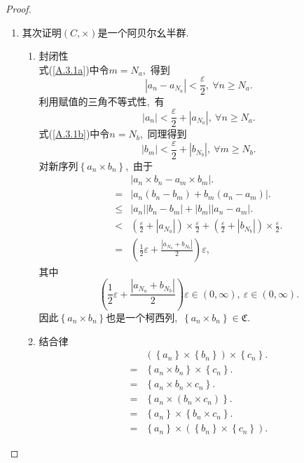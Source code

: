 \documentclass[UTF8, twoside]{ctexart}
\theoremstyle{nonumberplain}
\newtheorem{proof}{\heiti 证明}  %
\theoremstyle{nonumberplain}
\theoremstyle{plain}
\begin{document}
\begin{proof}
\begin{enumerate}
			\item 其次证明$\left( C,\times  \right)$是一个阿贝尔幺半群.\ 
			\vskip 0.3cm
			\begin{enumerate}
				\item 封闭性 \\
				式(\ref{A.3.1a})中令$m={{N}_{a}}$,\ 得到
				\[
					\left| {{a}_{n}}-{{a}_{{{N}_{a}}}} \right|<\frac{\varepsilon }{2},\ \forall n\ge {{N}_{a}}.
				\]
				利用赋值的三角不等式性,\ 有
				\[
					\left| {{a}_{n}} \right|<\frac{\varepsilon }{2}+\left| {{a}_{{{N}_{a}}}} \right|,\ \forall n\ge {{N}_{a}}.
				\]
				式(\ref{A.3.1b})中令$n={{N}_{b}}$,\ 同理得到
				\[
					\left| {{b}_{m}} \right|<\frac{\varepsilon }{2}+\left| {{b}_{{{N}_{b}}}} \right|,\ \forall m\ge {{N}_{b}}.
				\]
				对新序列$\left\{ {{a}_{n}}\times {{b}_{n}} \right\}$,\ 由于
				\begin{align*}
					& \left| {{a}_{n}}\times {{b}_{n}}-{{a}_{m}}\times {{b}_{m}} \right|. \\ 
					=&\left| {{a}_{n}}\left( {{b}_{n}}-{{b}_{m}} \right)+{{b}_{m}}\left( {{a}_{n}}-{{a}_{m}} \right) \right|. \\ 
					\le& \left| {{a}_{n}} \right|\left| {{b}_{n}}-{{b}_{m}} \right|+\left| {{b}_{m}} \right|\left| {{a}_{n}}-{{a}_{m}} \right|. \\ 
					<&\left( \frac{\varepsilon }{2}+\left| {{a}_{{{N}_{a}}}} \right| \right)\times \frac{\varepsilon }{2}+\left( \frac{\varepsilon }{2}+\left| {{b}_{{{N}_{b}}}} \right| \right)\times \frac{\varepsilon }{2}. \\ 
					=&\left( \frac{1}{2}\varepsilon +\frac{\left| {{a}_{{{N}_{a}}}}+{{b}_{{{N}_{b}}}} \right|}{2} \right)\varepsilon ,  
				\end{align*}
				其中
				\[
					\left( \frac{1}{2}\varepsilon +\frac{\left| {{a}_{{{N}_{a}}}}+{{b}_{{{N}_{b}}}} \right|}{2} \right)\varepsilon \in \left( 0,\infty  \right),
					\ \varepsilon \in \left( 0,\infty  \right).
				\]
				因此$\left\{ {{a}_{n}}\times {{b}_{n}} \right\}$也是一个柯西列,\ 
				$\left\{ {{a}_{n}}\times {{b}_{n}} \right\}\in \mathfrak{C}$.\ 
				\vskip 0.3cm
				
				\item 结合律 
				\begin{align*}
					&\left( \left\{ {{a}_{n}} \right\}\times \left\{ {{b}_{n}} \right\} \right)\times \left\{ {{c}_{n}} \right\}. \\ 
					=&\left\{ {{a}_{n}}\times {{b}_{n}} \right\}\times \left\{ {{c}_{n}} \right\}. \\ 
					=&\left\{ {{a}_{n}}\times {{b}_{n}}\times {{c}_{n}} \right\}. \\ 
					=&\left\{ {{a}_{n}}\times \left( {{b}_{n}}\times {{c}_{n}} \right) \right\} .\\ 
					=&\left\{ {{a}_{n}} \right\}\times \left\{ {{b}_{n}}\times {{c}_{n}} \right\} .\\ 
					=&\left\{ {{a}_{n}} \right\}\times \left( \left\{ {{b}_{n}} \right\}\times \left\{ {{c}_{n}} \right\} \right). 
				\end{align*}
				\vskip 0.3cm
			

\end{enumerate}
\end{enumerate}
\end{proof}
\end{document}
